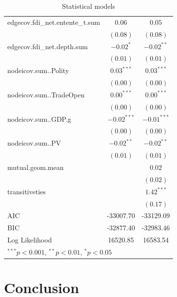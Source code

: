 \documentclass{article}
\begin{document}
\begin{table}
\begin{center}
\begin{tabular}{l c c }
edgecov.fdi\_net.entente\_t.sum  & $0.06$        & $0.05$        \\
                                 & $(0.08)$      & $(0.08)$      \\
edgecov.fdi\_net.depth.sum       & $-0.02^{*}$   & $-0.02^{**}$  \\
                                 & $(0.01)$      & $(0.01)$      \\
nodeicov.sum..Polity             & $0.03^{***}$  & $0.03^{***}$  \\
                                 & $(0.00)$      & $(0.00)$      \\
nodeicov.sum..TradeOpen          & $0.00^{***}$  & $0.00^{***}$  \\
                                 & $(0.00)$      & $(0.00)$      \\
nodeicov.sum..GDP.g              & $-0.02^{***}$ & $-0.01^{***}$ \\
                                 & $(0.00)$      & $(0.00)$      \\
nodeicov.sum..PV                 & $-0.02^{**}$  & $-0.02^{**}$  \\
                                 & $(0.01)$      & $(0.01)$      \\
mutual.geom.mean                 &               & $0.02$        \\
                                 &               & $(0.02)$      \\
transitiveties                   &               & $1.42^{***}$  \\
                                 &               & $(0.17)$      \\
\hline
AIC                              & -33007.70     & -33129.09     \\
BIC                              & -32877.40     & -32983.46     \\
Log Likelihood                   & 16520.85      & 16583.54      \\
\hline
\multicolumn{3}{l}{\scriptsize{$^{***}p<0.001$, $^{**}p<0.01$, $^*p<0.05$}}
\end{tabular}
\caption{Statistical models}
\label{table:coefficients}
\end{center}
\end{table}




\section{Conclusion}


\newpage


\end{document}
